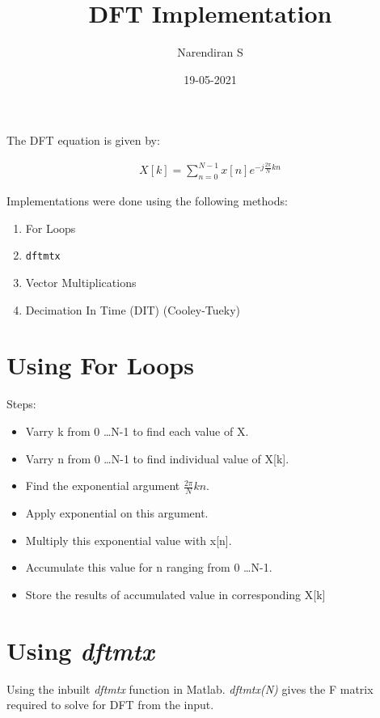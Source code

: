 \documentclass{article}
\title{DFT Implementation}
\author{Narendiran S}
\date{19-05-2021}
\begin{document}
\Large
\maketitle

The DFT equation is given by:

\begin{align*}
    X[k] = \sum_{n=0}^{N-1} x[n] e^{-j\frac{2\pi}{N} k n}
\end{align*}


Implementations were done using the following methods:

\begin{enumerate}[label=\alph*)]
    \item For Loops
    \item \verb|dftmtx|
    \item Vector Multiplications
    \item Decimation In Time (DIT) (Cooley-Tueky)
\end{enumerate}


\section{Using For Loops}
Steps:
\begin{itemize}
    \item Varry k from 0 \dots N-1 to find each value of X.
    \item Varry n from 0 \dots N-1  to find individual value of X[k].
    \item Find the exponential argument $\frac{2\pi}{N} k n$.
    \item Apply exponential on this argument.
    \item Multiply this exponential value with x[n].
    \item Accumulate this value for n ranging from  0 \dots N-1.
    \item Store the results of accumulated value in corresponding X[k]
\end{itemize}

\section{Using \emph{dftmtx}}
Using the inbuilt \emph{dftmtx} function in Matlab.
\emph{dftmtx(N)} gives the F matrix required to solve for DFT from the input.
\end{document}
